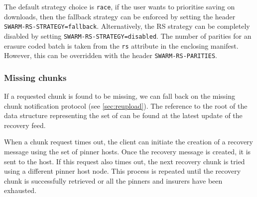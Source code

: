 The default strategy choice is \lstinline{race}, if the user wants to prioritise saving on downloads, then the fallback strategy can be enforced by setting the header \lstinline{SWARM-RS-STRATEGY=fallback}. Alternatively, the RS strategy can be completely disabled by setting \lstinline{SWARM-RS-STRATEGY=disabled}. The number of parities for an erasure coded batch is taken from the \lstinline{rs} attribute in the enclosing manifest. However, this can be overridden with the header \lstinline{SWARM-RS-PARITIES}.

\subsubsection{Missing chunks}

If a requested chunk is found to be missing, we can fall back on the missing chunk notification protocol (see \ref{sec:reupload}). The reference to the root of the data structure representing the set of  can be found at the latest update of the recovery feed. 

When a chunk request times out, the client can initiate the creation of a recovery message using the set of pinner hosts. Once the recovery message is created, it is sent to the host. If this request also times out, the next recovery chunk is tried using a different pinner host node. This process is repeated until the recovery chunk is successfully retrieved or all the pinners and insurers have been exhausted.



